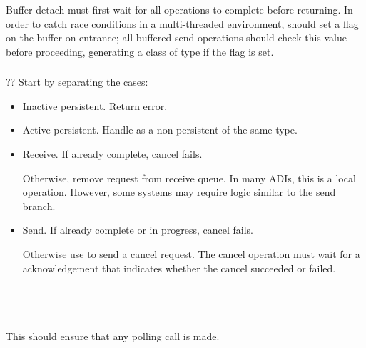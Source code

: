 \documentclass{article}
\begin{document}
\subsubsection{}
Buffer detach must first wait for all operations to complete before
returning.  
In order to catch race conditions in a multi-threaded environment, 
 should set a flag on the buffer on entrance; all
buffered send operations should check this value before proceeding, generating
a  class of type  if the flag is
set.

\subsubsection{}
\begin{adi3}
\begin{mmadi}??
Start by separating the cases:
\begin{itemize}
\item Inactive persistent.  Return error.
\item Active persistent.  Handle as a non-persistent of the same type.
\item Receive.  If already complete, cancel fails.  
\begin{core} Otherwise, remove request from receive queue.  In many
ADIs, this is a local operation.  However, some systems may require
logic similar to the send branch.
\end{core}
\item Send. If already complete or in progress, cancel fails.
\begin{core} Otherwise use  to send a cancel
request.  The cancel operation must wait for a acknowledgement that
indicates whether the cancel succeeded or failed.  
\end{core}
\end{itemize}
\end{mmadi}
\end{adi3}

\subsubsection{}
\begin{adi3}
\end{adi3}

\subsubsection{}
\begin{adi3}
\begin{mmadi}\\
\\
\begin{core}
This should ensure that any polling call is made.
\end{core}
\end{mmadi}
\end{adi3}
\end{document}
